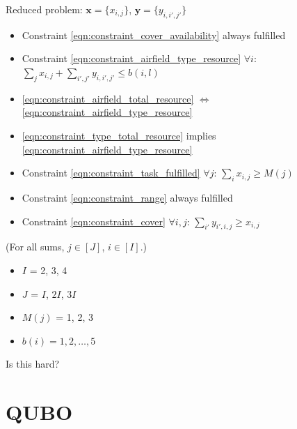 \documentclass{article}
\begin{document}
\noindent 
Reduced problem:
$\mathbf x = \{x_{i, j}\}$, $\mathbf y = \{y_{i, i' ,j'}\}$
\begin{itemize}
    \item Constraint \eqref{eqn:constraint_cover_availability} always fulfilled
    \item Constraint \eqref{eqn:constraint_airfield_type_resource} $\forall i$: $\sum_j x_{i,j} + \sum_{i', j'} y_{i, i', j'}  \leq b(i,l)$
    \item \eqref{eqn:constraint_airfield_total_resource} $\Leftrightarrow$ \eqref{eqn:constraint_airfield_type_resource}
    \item \eqref{eqn:constraint_type_total_resource} implies \eqref{eqn:constraint_airfield_type_resource}
    \item Constraint \eqref{eqn:constraint_task_fulfilled} $\forall j$: $\sum_{i} x_{i, j} \geq M(j)$
    \item Constraint \eqref{eqn:constraint_range} always fulfilled
    \item Constraint \eqref{eqn:constraint_cover} $\forall i, j$: $\sum_{i'} y_{i', i, j} \geq x_{i, j}$
\end{itemize}
(For all sums, $j \in [J]$, $i \in [I]$.)

\begin{itemize}
\item $I$ = 2, 3, 4
\item $J$ = $I$, $2I$, $3I$
\item $M(j)$ = 1, 2, 3
\item $b(i) = 1, 2, \ldots, 5$
\end{itemize}
Is this hard?

\section{QUBO}
\end{document}
